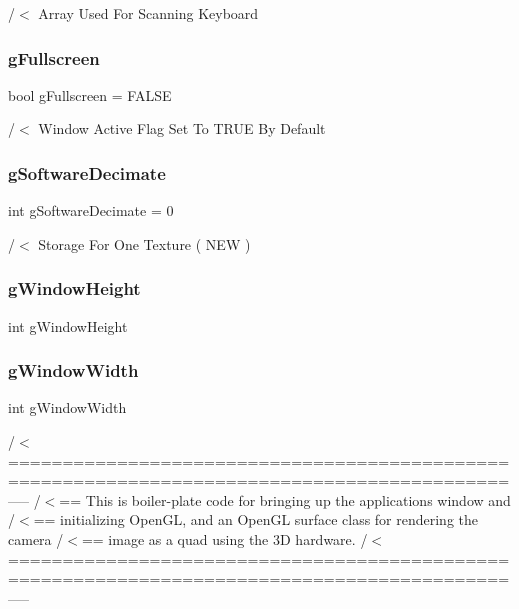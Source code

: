 /$<$ Array Used For Scanning Keyboard 

\mbox{\label{supportcode_8cpp_a7b5a9c7e9c526f41104703da9b9fa703}} 
\subsubsection{g\+Fullscreen}
{\footnotesize\ttfamily bool g\+Fullscreen = F\+A\+L\+SE}



/$<$ Window Active Flag Set To T\+R\+UE By Default 

\mbox{\label{supportcode_8cpp_a599780298ddd4a7f58dce693ca5367be}} 
\subsubsection{g\+Software\+Decimate}
{\footnotesize\ttfamily int g\+Software\+Decimate = 0}



/$<$ Storage For One Texture ( N\+EW ) 

\mbox{\label{supportcode_8cpp_a71831ba298cd6aa2fdd51d72bdf5be98}} 
\subsubsection{g\+Window\+Height}
{\footnotesize\ttfamily int g\+Window\+Height}

\mbox{\label{supportcode_8cpp_a6e4233ff9ab23aeef9133345aca8665d}} 
\subsubsection{g\+Window\+Width}
{\footnotesize\ttfamily int g\+Window\+Width}



/$<$============================================================================================----- /$<$== This is boiler-\/plate code for bringing up the application\textquotesingle{}s window and /$<$== initializing Open\+GL, and an Open\+GL surface class for rendering the camera /$<$== image as a quad using the 3D hardware. /$<$============================================================================================----- 

